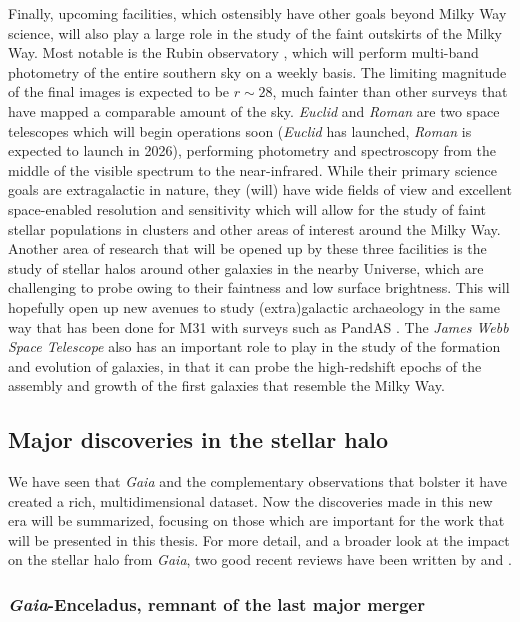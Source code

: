 Finally, upcoming facilities, which ostensibly have other goals beyond Milky Way science, will also play a large role in the study of the faint outskirts of the Milky Way. Most notable is the Rubin observatory \parencite{lsst}, which will perform multi-band photometry of the entire southern sky on a weekly basis. The limiting magnitude of the final images is expected to be $r \sim 28$, much fainter than other surveys that have mapped a comparable amount of the sky. \textit{Euclid} and \textit{Roman} are two space telescopes which will begin operations soon (\textit{Euclid} has launched, \textit{Roman} is expected to launch in 2026), performing photometry and spectroscopy from the middle of the visible spectrum to the near-infrared. While their primary science goals are extragalactic in nature, they (will) have wide fields of view and excellent space-enabled resolution and sensitivity which will allow for the study of faint stellar populations in clusters and other areas of interest around the Milky Way. Another area of research that will be opened up by these three facilities is the study of stellar halos around other galaxies in the nearby Universe, which are challenging to probe owing to their faintness and low surface brightness. This will hopefully open up new avenues to study (extra)galactic archaeology in the same way that has been done for M31 with surveys such as PandAS \parencite{mcconnachie09}. The \textit{James Webb Space Telescope} also has an important role to play in the study of the formation and evolution of galaxies, in that it can probe the high-redshift epochs of the assembly and growth of the first galaxies that resemble the Milky Way.

\subsection{Major discoveries in the stellar halo}

We have seen that \textit{Gaia} and the complementary observations that bolster it have created a rich, multidimensional dataset. Now the discoveries made in this new era will be summarized, focusing on those which are important for the work that will be presented in this thesis. For more detail, and a broader look at the impact on the stellar halo from \textit{Gaia}, two good recent reviews have been written by \textcite{helmi20} and \textcite{deason24}.

\subsubsection{\textit{Gaia}-Enceladus, remnant of the last major merger}

